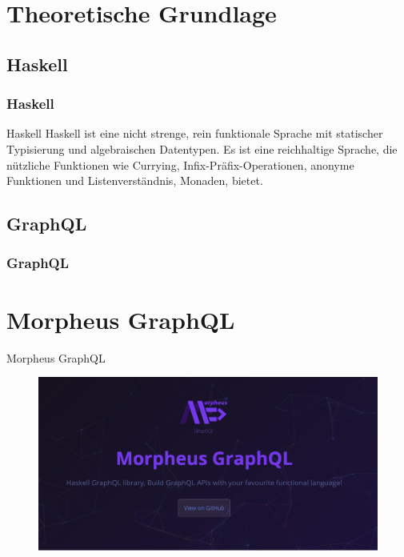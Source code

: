 
\section{Theoretische Grundlage}

\subsection{Haskell}
\begin{frame}{}
    \frametitle{Haskell}
\end{frame}

\begin{frame}{}

    \begin{alertblock}{Haskell}
        Haskell ist eine nicht strenge, rein funktionale Sprache mit statischer Typisierung und algebraischen Datentypen. Es ist eine reichhaltige Sprache, die nützliche Funktionen wie Currying, Infix-Präfix-Operationen, anonyme Funktionen und Listenverständnis, Monaden, bietet. 
    \end{alertblock}

\end{frame}


\subsection{GraphQL}
\begin{frame}{}
    \frametitle{GraphQL}
\end{frame}


\section{Morpheus GraphQL}
\begin{frame}{Morpheus GraphQL}
    \begin{figure}
        \centering
        \includegraphics[width=1.1\textwidth]{assets/img/morpheus-graphql-bg.png}
    \end{figure}
\end{frame}